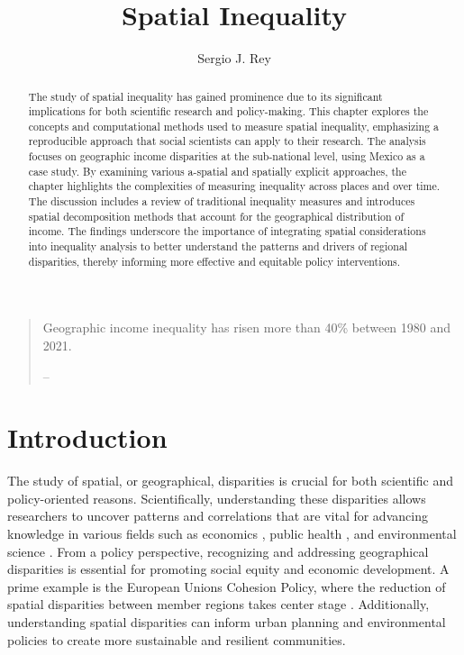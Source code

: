 \documentclass[
  a4paper, 
  twoside,
  final
]{article}
\title{Spatial Inequality}
\author{%
Sergio J. Rey\parnote{San Diego State University, San Diego, USA}}
\date{}
\begin{document}
\maketitle
\begin{abstract}
The study of spatial inequality has gained prominence due to its
significant implications for both scientific research and policy-making.
This chapter explores the concepts and computational methods used to
measure spatial inequality, emphasizing a reproducible approach that
social scientists can apply to their research. The analysis focuses on
geographic income disparities at the sub-national level, using Mexico as
a case study. By examining various a-spatial and spatially explicit
approaches, the chapter highlights the complexities of measuring
inequality across places and over time. The discussion includes a review
of traditional inequality measures and introduces spatial decomposition
methods that account for the geographical distribution of income. The
findings underscore the importance of integrating spatial considerations
into inequality analysis to better understand the patterns and drivers
of regional disparities, thereby informing more effective and equitable
policy interventions.
\end{abstract}


\begin{quote}
Geographic income inequality has risen more than 40\% between 1980 and
2021.

-- \citet{u.s.departmentofcommerce2023GeographicInequality}
\end{quote}

\section{Introduction}\label{introduction}

The study of spatial, or geographical, disparities is crucial for both
scientific and policy-oriented reasons. Scientifically, understanding
these disparities allows researchers to uncover patterns and
correlations that are vital for advancing knowledge in various fields
such as economics \citep{kanbur2005SpatialInequality}, public health
\citep{debnath2024GeographicDisparities}, and environmental science
\citep{venter2023EnvironmentalJustice}. From a policy perspective,
recognizing and addressing geographical disparities is essential for
promoting social equity and economic development. A prime example is the
European Union\textquotesingle s Cohesion Policy, where the reduction of
spatial disparities between member regions takes center stage
\citep{agnieszka2019RegionalInequalities}. Additionally, understanding
spatial disparities can inform urban planning and environmental policies
to create more sustainable and resilient communities.
\end{document}
